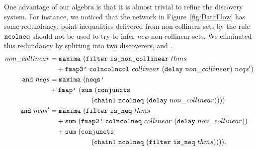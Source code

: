 One advantage of our algebra is that it is almost trivial to refine the discovery system. For instance, we noticed that the network in Figure~\ref{fig:DataFlow} has some redundancy: point-inequalities delivered from non-collinear sets by the rule $\texttt{ncolneq}$ should not be used to try to infer \emph{new} non-collinear sets. We eliminated this redundancy by splitting  into two discoverers,  and . 
\begin{align*}
non\_collinear &= \code{maxima}\ (\code{filter}\ \code{is\_non\_collinear}\ thms\\
&\quad + \code{fmap3'}\ \code{colncolncol}\ collinear\ (\code{delay}\ non\_collinear)\ neqs')\\
\code{and}\ neqs &= \code{maxima}\ (\code{neqs'}\\
& + \code{fmap'}\ (\code{sum}\ (\code{conjuncts}\\
&\qquad\qquad\qquad(\code{chain1}\ \code{ncolneq}\ (\code{delay}\ non\_collinear))))\\
\code{and}\ neqs' &= \code{maxima}\ (\code{filter}\ \code{is\_neq}\ thms\\
&\quad + \code{sum}\ (\code{fmap2'}\ \code{colncolneq}\ collinear\ (\code{delay}\ non\_collinear))\\
&\quad + \code{sum}\ (\code{conjuncts}\\
&\qquad\qquad\qquad(\code{chain1}\ \code{ncolneq}\ (\code{filter}\ \code{is\_neq}\ thms)))).
\end{align*}




